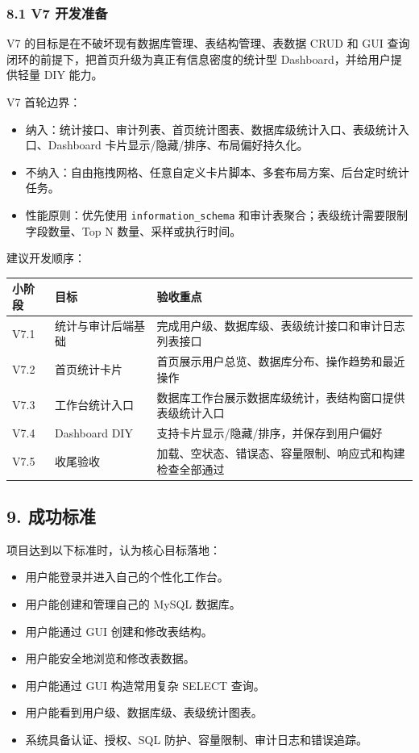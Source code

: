 \documentclass[
  a4paper,
  UTF8]{ctexart}
\providecommand{\tightlist}{%
  \setlength{\itemsep}{0pt}\setlength{\parskip}{0pt}}
\begin{document}
\hypertarget{v7-ux5f00ux53d1ux51c6ux5907}{%
\subsubsection{8.1 V7 开发准备}\label{v7-ux5f00ux53d1ux51c6ux5907}}

V7 的目标是在不破坏现有数据库管理、表结构管理、表数据 CRUD 和 GUI
查询闭环的前提下，把首页升级为真正有信息密度的统计型
Dashboard，并给用户提供轻量 DIY 能力。

V7 首轮边界：

\begin{itemize}
\tightlist
\item
  纳入：统计接口、审计列表、首页统计图表、数据库级统计入口、表级统计入口、Dashboard
  卡片显示/隐藏/排序、布局偏好持久化。
\item
  不纳入：自由拖拽网格、任意自定义卡片脚本、多套布局方案、后台定时统计任务。
\item
  性能原则：优先使用 \texttt{information\_schema}
  和审计表聚合；表级统计需要限制字段数量、Top N 数量、采样或执行时间。
\end{itemize}

建议开发顺序：

\begin{longtable}[]{@{}lll@{}}
\toprule
小阶段 & 目标 & 验收重点 \\
\midrule
\endhead
V7.1 & 统计与审计后端基础 &
完成用户级、数据库级、表级统计接口和审计日志列表接口 \\
V7.2 & 首页统计卡片 &
首页展示用户总览、数据库分布、操作趋势和最近操作 \\
V7.3 & 工作台统计入口 &
数据库工作台展示数据库级统计，表结构窗口提供表级统计入口 \\
V7.4 & Dashboard DIY & 支持卡片显示/隐藏/排序，并保存到用户偏好 \\
V7.5 & 收尾验收 &
加载、空状态、错误态、容量限制、响应式和构建检查全部通过 \\
\bottomrule
\end{longtable}

\hypertarget{ux6210ux529fux6807ux51c6}{%
\subsection{9. 成功标准}\label{ux6210ux529fux6807ux51c6}}

项目达到以下标准时，认为核心目标落地：

\begin{itemize}
\tightlist
\item
  用户能登录并进入自己的个性化工作台。
\item
  用户能创建和管理自己的 MySQL 数据库。
\item
  用户能通过 GUI 创建和修改表结构。
\item
  用户能安全地浏览和修改表数据。
\item
  用户能通过 GUI 构造常用复杂 SELECT 查询。
\item
  用户能看到用户级、数据库级、表级统计图表。
\item
  系统具备认证、授权、SQL 防护、容量限制、审计日志和错误追踪。
\end{itemize}
\end{document}
